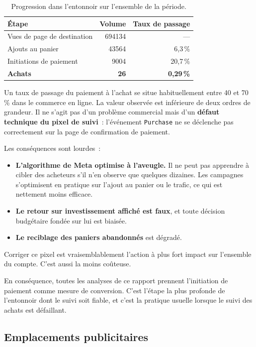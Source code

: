\documentclass[11pt,a4paper]{article}
\newcommand{\code}[1]{\texttt{\small #1}}
\begin{document}
\begin{table}[h]
\centering
\small
\begin{tabular}{@{}lrr@{}}
\toprule
\textbf{Étape} & \textbf{Volume} & \textbf{Taux de passage} \\
\midrule
Vues de page de destination & \num{694134} & --- \\
Ajouts au panier            & \num{43564}  & 6{,}3\,\% \\
Initiations de paiement     & \num{9004}   & 20{,}7\,\% \\
\textbf{Achats}             & \textbf{\num{26}} & \textbf{0{,}29\,\%} \\
\bottomrule
\end{tabular}
\caption{Progression dans l'entonnoir sur l'ensemble de la période.}
\end{table}

Un taux de passage du paiement à l'achat se situe habituellement entre 40 et
70\,\% dans le commerce en ligne. La valeur observée est inférieure de deux
ordres de grandeur. Il ne s'agit pas d'un problème commercial mais d'un
\textbf{défaut technique du pixel de suivi}~: l'événement \code{Purchase} ne se
déclenche pas correctement sur la page de confirmation de paiement.

Les conséquences sont lourdes~:

\begin{itemize}
  \item \textbf{L'algorithme de Meta optimise à l'aveugle.} Il ne peut pas
        apprendre à cibler des acheteurs s'il n'en observe que quelques
        dizaines. Les campagnes s'optimisent en pratique sur l'ajout au panier
        ou le trafic, ce qui est nettement moins efficace.
  \item \textbf{Le retour sur investissement affiché est faux}, et toute
        décision budgétaire fondée sur lui est biaisée.
  \item \textbf{Le reciblage des paniers abandonnés} est dégradé.
\end{itemize}

Corriger ce pixel est vraisemblablement l'action à plus fort impact sur
l'ensemble du compte. C'est aussi la moins coûteuse.

En conséquence, toutes les analyses de ce rapport prennent l'initiation de
paiement comme mesure de conversion. C'est l'étape la plus profonde de
l'entonnoir dont le suivi soit fiable, et c'est la pratique usuelle lorsque le
suivi des achats est défaillant.

\subsection{Emplacements publicitaires}
\end{document}

